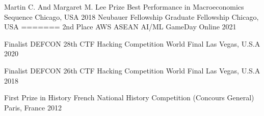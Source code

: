 



\begin{cvhonors}

	\cvhonor
	{Martin C. And Margaret M. Lee Prize} %
	{Best Performance in Macroeconomics Sequence} %
	{Chicago, USA} %
	{2018} %
	\cvhonor
	{Neubauer Fellowship} %
	{Graduate Fellowship} %
	{Chicago, USA} %
	=======
	\cvhonor
	{2nd Place} %
	{AWS ASEAN AI/ML GameDay} %
	{Online} %
	{2021} %

	\cvhonor
	{Finalist} %
	{DEFCON 28th CTF Hacking Competition World Final} %
	{Las Vegas, U.S.A} %
	{2020} %

	\cvhonor
	{Finalist} %
	{DEFCON 26th CTF Hacking Competition World Final} %
	{Las Vegas, U.S.A} %
	{2018} %

	\cvhonor
	{First Prize in History} %
	{French National History Competition (Concours General)} %
	{Paris, France} %
	{2012} %

\end{cvhonors}




